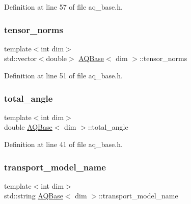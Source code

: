 Definition at line 57 of file aq\+\_\+base.\+h.

\mbox{\label{class_a_q_base_a89db12cbc1a0a01420897480ab8678e8}} 
\subsubsection{\texorpdfstring{tensor\+\_\+norms}{tensor\_norms}}
{\footnotesize\ttfamily template$<$int dim$>$ \\
std\+::vector$<$double$>$ \hyperlink{class_a_q_base}{A\+Q\+Base}$<$ dim $>$\+::tensor\+\_\+norms\hspace{0.3cm}{\ttfamily [protected]}}



Definition at line 51 of file aq\+\_\+base.\+h.

\mbox{\label{class_a_q_base_a930e1dbffe2c99f42b76ea3164905ac1}} 
\subsubsection{\texorpdfstring{total\+\_\+angle}{total\_angle}}
{\footnotesize\ttfamily template$<$int dim$>$ \\
double \hyperlink{class_a_q_base}{A\+Q\+Base}$<$ dim $>$\+::total\+\_\+angle\hspace{0.3cm}{\ttfamily [protected]}}



Definition at line 41 of file aq\+\_\+base.\+h.

\mbox{\label{class_a_q_base_a14d94b7179306f35228b90fd5f42c65a}} 
\subsubsection{\texorpdfstring{transport\+\_\+model\+\_\+name}{transport\_model\_name}}
{\footnotesize\ttfamily template$<$int dim$>$ \\
std\+::string \hyperlink{class_a_q_base}{A\+Q\+Base}$<$ dim $>$\+::transport\+\_\+model\+\_\+name\hspace{0.3cm}{\ttfamily [protected]}}



